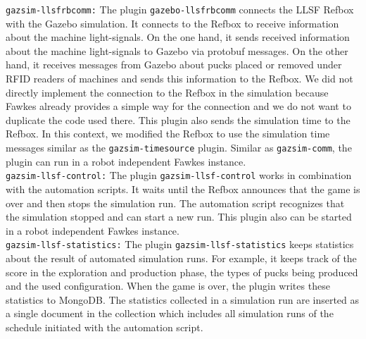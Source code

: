 \texttt{gazsim-llsfrbcomm:}
The plugin \texttt{gazebo-llsfrbcomm} connects the LLSF Refbox with the Gazebo simulation. It connects to the Refbox to receive information about the machine light-signals. On the one hand, it sends received information about the machine light-signals to Gazebo via protobuf messages. On the other hand, it receives messages from Gazebo about pucks placed or removed under RFID readers of machines and sends this information to the Refbox. We did not directly implement the connection to the Refbox in the simulation because Fawkes already provides a simple way for the connection and we do not want to duplicate the code used there. This plugin also sends the simulation time to the Refbox. In this context, we modified the Refbox to use the simulation time messages similar as the \texttt{gazsim-timesource} plugin. Similar as \texttt{gazsim-comm}, the plugin can run in a robot independent Fawkes instance.
\\

\texttt{gazsim-llsf-control:}
The plugin \texttt{gazsim-llsf-control} works in combination with the automation scripts. It waits until the Refbox announces that the game is over and then stops the simulation run. The automation script recognizes that the simulation stopped and can start a new run. This plugin also can be started in a robot independent Fawkes instance.
\\

\texttt{gazsim-llsf-statistics:}
The plugin \texttt{gazsim-llsf-statistics} keeps statistics about the result of automated simulation runs. For example, it keeps track of the score in the exploration and production phase, the types of pucks being produced and the used configuration. When the game is over, the plugin writes these statistics to MongoDB. The statistics collected in a simulation run are inserted as a single document in the collection which includes all simulation runs of the schedule initiated with the automation script.



